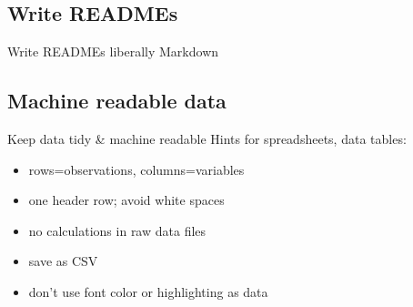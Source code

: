 \documentclass[10pt,aspectratio=169,notes]{beamer} %
\begin{document}
\subsection{Write READMEs}
\begin{frame}[label=frame15]{Write READMEs liberally}
Markdown	
\end{frame}
\note{}
\subsection{Machine readable data}
\begin{frame}[label=frame16]{Keep data tidy \& machine readable}
Hints for spreadsheets, data tables:
\begin{itemize}
	\item rows=observations, columns=variables
	\item one header row; avoid white spaces
	\item no calculations in raw data files
	\item save as CSV
	\item don't use font color or highlighting as data
\end{itemize}	
\end{frame}
\note{}
\end{document}
